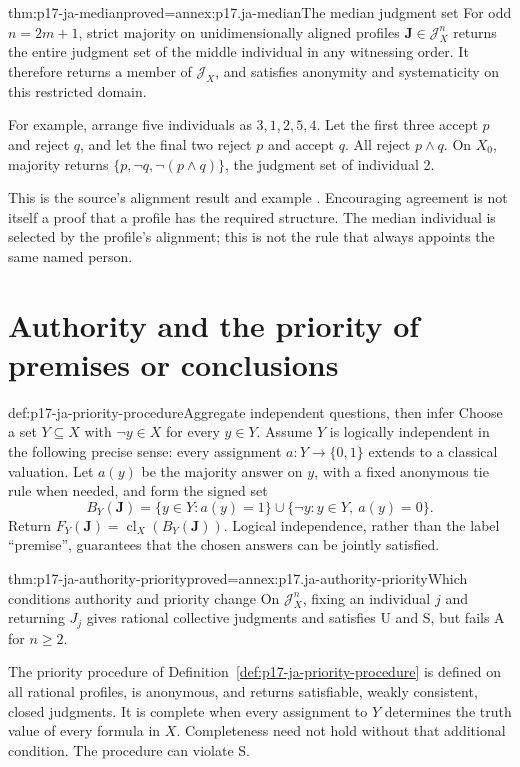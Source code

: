 \begin{hbtheorem}{thm:p17-ja-median}{proved=annex:p17.ja-median}{The median judgment set}
For odd \(n=2m+1\), strict majority on unidimensionally aligned profiles
\(\mathbf J\in\mathcal J_X^n\) returns
the entire judgment set of the middle individual in any witnessing order.
It therefore returns a member of \(\mathcal J_X\), and satisfies anonymity
and systematicity on this restricted domain.

For example, arrange five individuals as \(3,1,2,5,4\). Let the first three
accept \(p\) and reject \(q\), and let the final two reject \(p\) and accept
\(q\). All reject \(p\land q\). On \(X_0\), majority returns
\(\{p,\neg q,\neg(p\land q)\}\), the judgment set of individual 2.
\end{hbtheorem}

This is the source's alignment result and example
\cite[pp.~17--19]{ListPettit2001JudgmentPreprint}. Encouraging agreement is
not itself a proof that a profile has the required structure. The median
individual is selected by the profile's alignment; this is not the rule that
always appoints the same named person.

\section{Authority and the priority of premises or conclusions}
\label{sec:p17-ja-priority}

\begin{hbmethod}{def:p17-ja-priority-procedure}{Aggregate independent questions, then infer}
Choose a set \(Y\subseteq X\) with \(\neg y\in X\) for every \(y\in Y\).
Assume \(Y\) is logically independent in the following precise sense: every
assignment \(a:Y\to\{0,1\}\) extends to a classical valuation.
Let \(a(y)\) be the majority answer on \(y\), with a fixed anonymous tie rule
when needed, and form the signed set
\[
 B_Y(\mathbf J)=\{y\in Y:a(y)=1\}\cup
                \{\neg y:y\in Y,\ a(y)=0\}.
\]
Return \(F_Y(\mathbf J)=\operatorname{cl}_X(B_Y(\mathbf J))\).
Logical independence, rather than the label ``premise'', guarantees that the
chosen answers can be jointly satisfied.
\end{hbmethod}

\begin{hbtheorem}{thm:p17-ja-authority-priority}{proved=annex:p17.ja-authority-priority}{Which conditions authority and priority change}
On \(\mathcal J_X^n\), fixing an individual \(j\) and returning \(J_j\) gives rational collective
judgments and satisfies U and S, but fails A for \(n\geq2\).

The priority procedure of Definition~\ref{def:p17-ja-priority-procedure}
is defined on all rational profiles, is anonymous, and returns satisfiable,
weakly consistent, closed judgments. It is complete when every assignment to
\(Y\) determines the truth value of every formula in \(X\). Completeness need
not hold without that additional condition. The procedure can violate S.
\end{hbtheorem}

